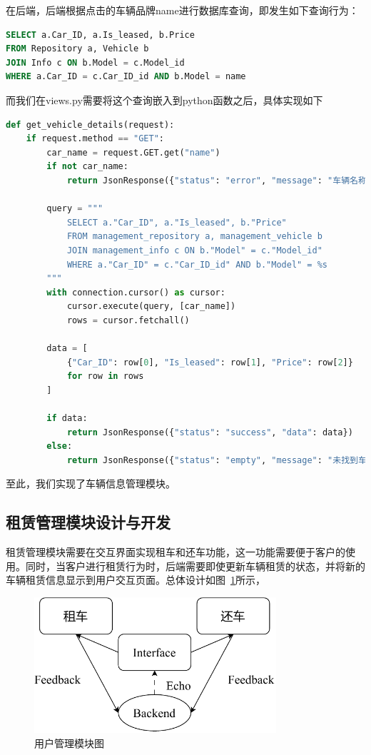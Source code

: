 \documentclass[UTF8,a4paper,12pt]{ctexart}
\begin{document}
在后端，后端根据点击的车辆品牌name进行数据库查询，即发生如下查询行为：
\begin{lstlisting}[language=SQL]
SELECT a.Car_ID, a.Is_leased, b.Price
FROM Repository a, Vehicle b
JOIN Info c ON b.Model = c.Model_id
WHERE a.Car_ID = c.Car_ID_id AND b.Model = name
\end{lstlisting}
而我们在views.py需要将这个查询嵌入到python函数之后，具体实现如下
\begin{lstlisting}[language=Python]
def get_vehicle_details(request):
    if request.method == "GET":
        car_name = request.GET.get("name")
        if not car_name:
            return JsonResponse({"status": "error", "message": "车辆名称不能为空"})

        query = """
            SELECT a."Car_ID", a."Is_leased", b."Price"
            FROM management_repository a, management_vehicle b
            JOIN management_info c ON b."Model" = c."Model_id"
            WHERE a."Car_ID" = c."Car_ID_id" AND b."Model" = %s
        """
        with connection.cursor() as cursor:
            cursor.execute(query, [car_name])
            rows = cursor.fetchall()

        data = [
            {"Car_ID": row[0], "Is_leased": row[1], "Price": row[2]}
            for row in rows
        ]

        if data:
            return JsonResponse({"status": "success", "data": data})
        else:
            return JsonResponse({"status": "empty", "message": "未找到车辆详情"})
\end{lstlisting}
至此，我们实现了车辆信息管理模块。

\subsection{租赁管理模块设计与开发}
租赁管理模块需要在交互界面实现租车和还车功能，这一功能需要便于客户的使用。同时，当客户进行租赁行为时，后端需要即使更新车辆租赁的状态，并将新的车辆租赁信息显示到用户交互页面。总体设计如图~\ref{fig:lease}所示，
\begin{figure}[htbp]  %
    \centering  %
    \includegraphics[width=0.8\textwidth]{pic/lease.pdf}
    \caption{用户管理模块图}  %
    \label{fig:lease}  %
\end{figure}
\end{document}
